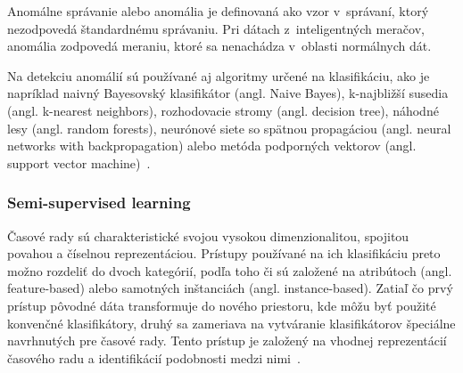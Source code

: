 \documentclass[a4paper,twoside,slovak,12pt]{article}
\begin{document}
Anomálne správanie alebo anomália je definovaná ako vzor v~správaní, ktorý
nezodpovedá štandardnému správaniu. Pri dátach z~inteligentných meračov, anomália
zodpovedá meraniu, ktoré sa nenachádza v~oblasti normálnych dát.

Na detekciu anomálií sú používané aj algoritmy určené na klasifikáciu, ako je
napríklad naivný Bayesovský klasifikátor (angl. Naive Bayes), k-najbližší
susedia (angl. k-nearest neighbors), rozhodovacie stromy (angl. decision tree),
náhodné lesy (angl. random forests), neurónové siete so spätnou propagáciou
(angl. neural networks with backpropagation) alebo metóda podporných vektorov
(angl. support vector machine)~\cite{Coma-Puig2016}.

\subsubsection{Semi-supervised learning}

Časové rady sú charakteristické svojou vysokou dimenzionalitou, spojitou povahou
a číselnou reprezentáciou. Prístupy používané na ich klasifikáciu preto možno
rozdeliť do dvoch kategórií, podľa toho či sú založené na atribútoch (angl.
feature-based) alebo samotných inštanciách (angl. instance-based). Zatiaľ čo
prvý prístup pôvodné dáta transformuje do nového priestoru, kde môžu byť použité
konvenčné klasifikátory, druhý sa zameriava na vytváranie klasifikátorov
špeciálne navrhnutých pre časové rady. Tento prístup je založený na vhodnej
reprezentácií časového radu a identifikácií podobnosti medzi
nimi~\cite{Gonzalez2017}.
\end{document}
